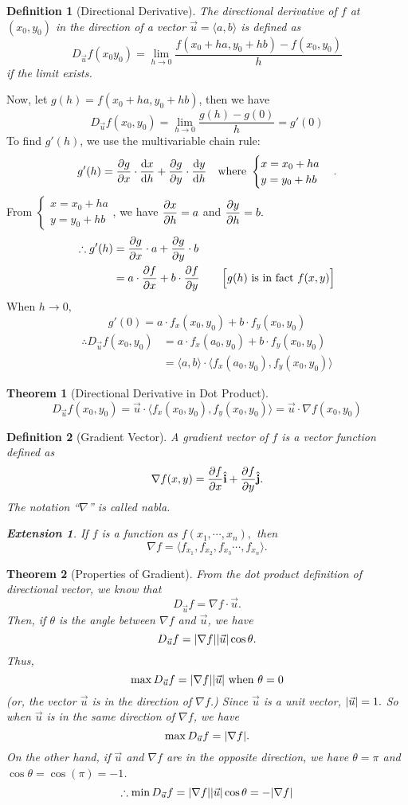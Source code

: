 \documentclass[12pt,a4paper]{article}
\newtheorem{thm}{Theorem}[subsection]
\newtheorem{df}{Definition}[subsection]
\newtheorem*{ext}{\indent Extension}
\def\vecu{\vec{u}}
\def\veci{\hat{\boldsymbol{\textbf{i}}}}
\def\vecj{\hat{\boldsymbol{\textbf{j}}}}
\begin{document}
\begin{df}[Directional Derivative]
	The directional derivative of $f$ at $(x_0,y_0)$ in the direction of a vector $\vecu=\langle a,b\rangle$ is defined as \[D_{\vecu} f(x_0y_0)=\lim_{h\to0}\frac{f(x_0+ha,y_0+hb)-f(x_0,y_0)}{h}\] if the limit exists.
\end{df}
Now, let $g(h)=f(x_0+ha,y_0+hb)$, then we have \[D_{\vecu}f(x_0,y_0)=\lim_{h\to0}\frac{g(h)-g(0)}{h}=g'(0)\] To find $g'(h)$, we use the multivariable chain rule:\[g'(h)=\pdv{g}{x}\cdot\dv{x}{h}+\pdv{g}{y}\cdot\dv{y}{h}\quad\text{where }\begin{cases}x=x_0+ha\\y=y_0+hb\end{cases}.\] From $\begin{cases}x=x_0+ha\\y=y_0+hb\end{cases}$, we have $\displaystyle\pdv{x}{h}=a$ and $\displaystyle\pdv{y}{h}=b.$ \[\begin{aligned}\therefore g'(h)&=\pdv{g}{x}\cdot a+\pdv{g}{y}\cdot b\\&=a\cdot\pdv{f}{x}+b\cdot\pdv{f}{y}\qquad\Big[g(h)\text{ is in fact }f(x,y)\Big]\end{aligned}\] When $h\to0,$ \[g'(0)=a\cdot f_x(x_0,y_0)+b\cdot f_y(x_0,y_0)\]\[\begin{aligned}\therefore D_{\vecu}f(x_0,y_0)&=a\cdot f_x(a_0,y_0)+b\cdot f_y(x_0,y_0)\\&=\langle a,b\rangle\cdot\langle f_x(a_0,y_0),f_y(x_0,y_0)\rangle\end{aligned}\]
\begin{thm}[Directional Derivative in Dot Product]
	\[D_{\vecu}f(x_0,y_0)=\vecu\cdot\langle f_x(x_0,y_0), f_y(x_0,y_0)\rangle=\vecu\cdot\nabla f(x_0,y_0)\]
\end{thm}
\begin{df}[Gradient Vector]
	A gradient vector of $f$ is a vector function defined as \[\nabla f(x,y)=\pdv{f}{x}\veci+\pdv{f}{y}\vecj.\] The notation ``$\nabla$'' is called nabla.
	\begin{ext}
		If $f$ is a function as $f(x_1,\cdots,x_n),$ then \[\nabla f=\langle f_{x_1},f_{x_2}, f_{x_3}\cdots,f_{x_n}\rangle.\]
	\end{ext}
\end{df}
\begin{thm}[Properties of Gradient]
	From the dot product definition of directional vector, we know that \[D_{\vecu}f=\nabla f\cdot\vecu.\] Then, if $\theta$ is the angle between $\nabla f$ and $\vecu$, we have \[D_{\vecu}f=\qty|\nabla f|\qty|\vecu|\cos\theta.\] Thus, \[\max D_{\vecu}f=\qty|\nabla f|\qty|\vecu|\text{ when }\theta=0\] (or, the vector $\vecu$ is in the direction of $\nabla f$.) Since $\vecu$ is a unit vector, $\qty|\vecu|=1.$ So when $\vecu$ is in the same direction of $\nabla f$, we have \[\max D_{\vecu}f=\qty|\nabla f|.\] On the other hand, if $\vecu$ and $\nabla f$ are in the opposite direction, we have $\theta=\pi$ and $\cos\theta=\cos(\pi)=-1$.\[\therefore\min D_{\vecu}f=\qty|\nabla f|\qty|\vecu|\cos\theta=-\qty|\nabla f|\]
\end{thm}
\end{document}
